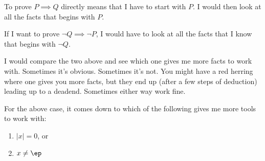 To prove $P \implies Q$ directly means that I have to start with $P$.
I would then look at all the facts that begins with $P$.

If I want to prove $\lnot Q \implies \lnot P$, I would have to 
look at all the facts that I know that begins with $\lnot Q$.

I would compare the two above and see which one gives me more
facts to work with.
Sometimes it's obvious.
Sometimes it's not.
You might have a red herring where one gives you more facts, but
they end up (after a few steps of deduction) leading up to a deadend.
Sometimes either way work fine.

For the above case, it comes down to which of the following gives me
more tools to work with:
\begin{enumerate}
\item $|x| = 0$, or
\item $x \neq \ep$
\end{enumerate}

